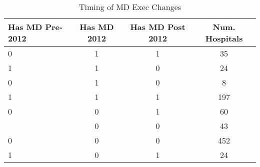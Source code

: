\begin{table}[ht!]
\centering
\caption{\label{change_timing}Timing of MD Exec Changes}
\centering
\begin{tabular}[t]{lccc}
\toprule
Has MD Pre-2012 & Has MD 2012 & Has MD Post 2012 & Num. Hospitals\\
\midrule
0 & 1 & 1 & 35\\
1 & 1 & 0 & 24\\
0 & 1 & 0 & 8\\
1 & 1 & 1 & 197\\
0 & 0 & 1 & 60\\
\addlinespace
1 & 0 & 0 & 43\\
0 & 0 & 0 & 452\\
1 & 0 & 1 & 24\\
\bottomrule
\end{tabular}
\end{table}

